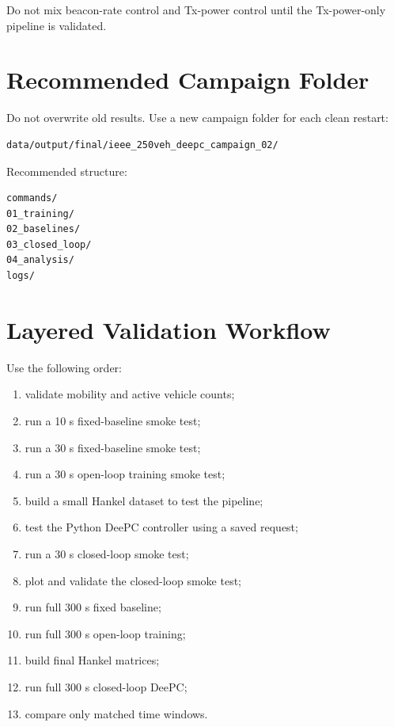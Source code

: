 \documentclass[11pt]{article}
\begin{document}
Do not mix beacon-rate control and Tx-power control until the Tx-power-only pipeline is validated.

\section{Recommended Campaign Folder}

Do not overwrite old results. Use a new campaign folder for each clean restart:

\begin{lstlisting}
data/output/final/ieee_250veh_deepc_campaign_02/
\end{lstlisting}

Recommended structure:

\begin{lstlisting}
commands/
01_training/
02_baselines/
03_closed_loop/
04_analysis/
logs/
\end{lstlisting}

\section{Layered Validation Workflow}

Use the following order:

\begin{enumerate}
    \item validate mobility and active vehicle counts;
    \item run a 10 s fixed-baseline smoke test;
    \item run a 30 s fixed-baseline smoke test;
    \item run a 30 s open-loop training smoke test;
    \item build a small Hankel dataset to test the pipeline;
    \item test the Python DeePC controller using a saved request;
    \item run a 30 s closed-loop smoke test;
    \item plot and validate the closed-loop smoke test;
    \item run full 300 s fixed baseline;
    \item run full 300 s open-loop training;
    \item build final Hankel matrices;
    \item run full 300 s closed-loop DeePC;
    \item compare only matched time windows.
\end{enumerate}
\end{document}
